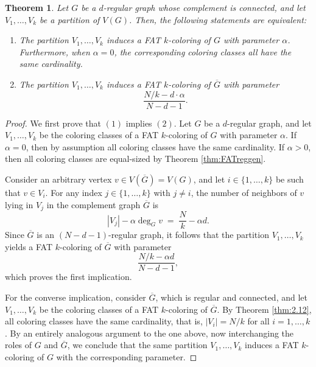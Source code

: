 \documentclass{article}
\theoremstyle{plain}
\newtheorem{theorem}{Theorem}[section]
\theoremstyle{definition}
\theoremstyle{remark}
\begin{document}
\begin{theorem}\label{thm:comp}
    Let $G$ be a $d$-regular graph whose complement is connected, and let $V_1,\ldots,V_k$ be a partition of $V(G)$. Then, the following statements are equivalent:
    \begin{enumerate}[label=(\arabic*)]
        \item The partition $V_1,\ldots,V_k$ induces a FAT $k$-coloring of $G$ with parameter $\alpha$. Furthermore, when $\alpha = 0$, the corresponding coloring classes all have the same cardinality.
        \item The partition $V_1,\ldots,V_k$ induces a FAT $k$-coloring of $\overline G$ with parameter
        \[
        \frac{N/k-d\cdot \alpha}{N-d-1}.
        \]
    \end{enumerate}
\end{theorem}

\begin{proof}
    We first prove that $(1)$ implies $(2)$. Let $G$ be a $d$-regular graph, and let $V_1,\ldots,V_k$ be the coloring classes of a FAT $k$-coloring of $G$ with parameter $\alpha$. If $\alpha=0$, then by assumption all coloring classes have the same cardinality. If $\alpha>0$, then all coloring classes are equal-sized by Theorem \ref{thm:FATreggen}.
    
    Consider an arbitrary vertex $v \in V(\overline G) = V(G)$, and let $i \in \{1,\ldots,k\}$ be such that $v \in V_i$. For any index $j \in \{1,\ldots,k\}$ with $j \neq i$, the number of neighbors of $v$ lying in $V_j$ in the complement graph $\overline G$ is
    \[
    |V_j| - \alpha \deg_G v \;=\; \frac{N}{k} - \alpha d.
    \]
    Since $\overline G$ is an $(N-d-1)$-regular graph, it follows that the partition $V_1,\ldots,V_k$ yields a FAT $k$-coloring of $\overline G$ with parameter
    \[
        \frac{N/k - \alpha d}{N-d-1},
    \]
    which proves the first implication.
    
    For the converse implication, consider $\overline G$, which is regular and connected, and let $V_1,\ldots,V_k$ be the coloring classes of a FAT $k$-coloring of $\overline G$. By Theorem \ref{thm:2.12}, all coloring classes have the same cardinality, that is, $|V_i|=N/k$ for all $i=1,\ldots,k$.
    By an entirely analogous argument to the one above, now interchanging the roles of $G$ and $\overline G$, we conclude that the same partition $V_1,\ldots,V_k$ induces a FAT $k$-coloring of $G$ with the corresponding parameter.
\end{proof}
\end{document}
